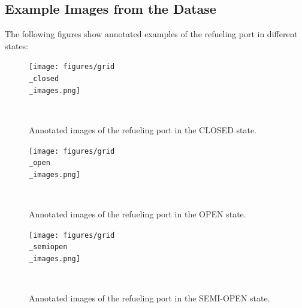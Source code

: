 \documentclass[12pt,oneside]{book} %
\begin{document}
\subsection{Example Images from the Datase}
The following figures show annotated examples of the refueling port in
different states:
\begin{figure}[H]
    \centering
    \texttt{[image: figures/grid\\\_closed\\\_images.png]}
    \caption{Annotated images of the refueling port in the CLOSED state.}~\label{fig:grid-closed-images}
\end{figure}

\begin{figure}[H]
    \centering
    \texttt{[image: figures/grid\\\_open\\\_images.png]}
    \caption{Annotated images of the refueling port in the OPEN state.}~\label{fig:grid-open-images}
\end{figure}

\begin{figure}[H]
    \centering
    \texttt{[image: figures/grid\\\_semiopen\\\_images.png]}
    \caption{Annotated images of the refueling port in the SEMI-OPEN state.}~\label{fig:grid-semi-open-images}
\end{figure}
\end{document}
